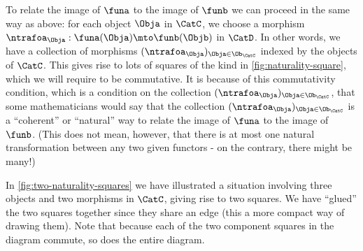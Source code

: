 To relate the image of $\funa$ to the image of $\funb$ we can proceed in the same way as above: for each object $\Obja$ in $\CatC$, we choose a morphism $\ntrafoa_\Obja : \funa(\Obja) \mto \funb(\Objb)$ in $\CatD$.
In other words, we have a collection of morphisms $(\ntrafoa_\Obja)_{\Obja \in \Ob_\CatC}$ indexed by the objects of $\CatC$.
This gives rise to lots of squares of the kind in \cref{fig:naturality-square}, which we will require to be commutative.
It is because of this commutativity condition, which is a condition on the collection $(\ntrafoa_\Obja)_{\Obja \in \Ob_\CatC}$, that some mathematicians would say that the collection $(\ntrafoa_\Obja)_{\Obja \in \Ob_\CatC}$ is a ``coherent'' or ``natural'' way to relate the image of $\funa$ to the image of $\funb$.
(This does not mean, however, that there is at most one natural transformation between any two given functors - on the contrary, there might be many!)

In \cref{fig:two-naturality-squares} we have illustrated a situation involving three objects and two morphisms in $\CatC$, giving rise to two squares.
We have ``glued'' the two squares together since they share an edge (this a more compact way of drawing them).
Note that because each of the two component squares in the diagram commute, so does the entire diagram.

%
\begin{marginfigure}
    \centering
    \caption{}
    \label{fig:two-naturality-squares}
\end{marginfigure}
%

\


